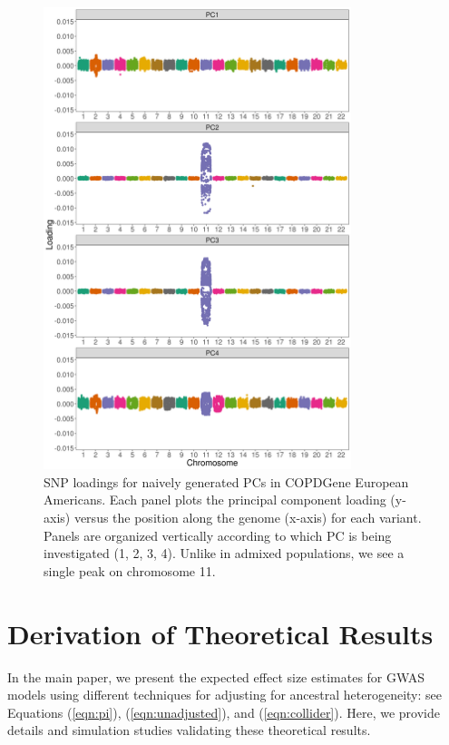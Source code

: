 \documentclass[12pt]{article}
\begin{document}
\begin{figure}
\center
\includegraphics[width=0.8\textwidth]{figs/COPD/EUR_prune_FALSE_1_0_0.01_snprelate_load_1}
\caption[SNP loadings in COPDGene European Americans.]{SNP loadings for naively generated PCs in COPDGene European Americans. Each panel plots the principal component loading (y-axis) versus the position along the genome (x-axis) for each variant. Panels are organized vertically according to which PC is being investigated (1, 2, 3, 4). Unlike in admixed populations, we see a single peak on chromosome 11.}
\label{fig:corr-Eur}
\end{figure}


\newpage
\section{Derivation of Theoretical Results}
\label{sec:theory}

In the main paper, we present the expected effect size estimates for GWAS models using different techniques for adjusting for ancestral heterogeneity: see Equations (\ref{eqn:pi}), (\ref{eqn:unadjusted}), and (\ref{eqn:collider}).
Here, we provide details and simulation studies validating these theoretical results.
\end{document}
